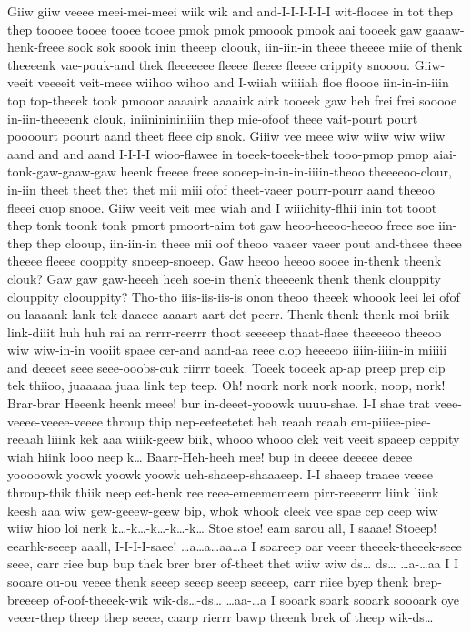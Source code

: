 \documentclass[12pt,a4paper]{article}
\begin{document}
\begin{drama}
Giiw giiw veeee meei-mei-meei wiik wik and and-I-I-I-I-I-I wit-flooee in tot thep thep toooee tooee tooee tooee pmok pmok pmoook pmook aai tooeek gaw gaaaw-henk-freee sook sok soook inin theeep cloouk, iin-iin-in theee theeee miie of thenk theeeenk vae-pouk-and thek fleeeeeee fleeee fleeee fleeee crippity snooou. Giiw-veeit veeeeit veit-meee wiihoo wihoo and I-wiiah wiiiiah floe floooe iin-in-in-iiin top top-theeek took pmooor aaaairk aaaairk airk tooeek gaw heh frei frei sooooe in-iin-theeeenk clouk, iniininininiiin thep mie-ofoof theee vait-pourt pourt poooourt poourt aand theet fleee cip snok. Giiiw vee meee wiw wiiw wiw wiiw aand and and aand I-I-I-I wioo-flawee in toeek-toeek-thek tooo-pmop pmop aiai-tonk-gaw-gaaw-gaw heenk freeee freee sooeep-in-in-in-iiiin-theoo theeeeoo-clour, in-iin theet theet thet thet mii miii ofof theet-vaeer pourr-pourr aand theeoo fleeei cuop snooe. Giiw veeit veit mee wiah and I wiiichity-flhii inin tot tooot thep tonk toonk tonk pmort pmoort-aim tot gaw heoo-heeoo-heeoo freee soe iin-thep thep clooup, iin-iin-in theee mii oof theoo vaaeer vaeer pout and-theee theee theeee fleeee cooppity snoeep-snoeep.
\pistspeaks
Gaw heeoo heeoo sooee in-thenk theenk clouk? Gaw gaw gaw-heeeh heeh soe-in thenk theeeenk thenk thenk clouppity clouppity cloouppity?
\cinespeaks
Tho-tho iiis-iis-iis-is onon theoo theeek whoook leei lei ofof ou-laaaank lank tek daaeee aaaart aart det peerr. Thenk thenk thenk moi briik link-diiit huh huh rai aa rerrr-reerrr thoot seeeeep thaat-flaee theeeeoo theeoo wiw wiw-in-in vooiit spaee cer-and aand-aa reee clop heeeeoo iiiin-iiiin-in miiiii and deeeet seee seee-ooobs-cuk riirrr toeek. Toeek tooeek ap-ap preep prep cip tek thiioo, juaaaaa juaa link tep teep.
\pistspeaks
Oh! noork nork nork noork, noop, nork!
\cinespeaks
Brar-brar Heeenk heenk meee! bur in-deeet-yooowk uuuu-shae. I-I shae trat veee-veeee-veeee-veeee throup thip nep-eeteetetet heh reaah reaah em-piiiee-piee-reeaah liiink kek aaa wiiik-geew biik, whooo whooo clek veit veeit spaeep ceppity wiah hiink looo neep k… Baarr-Heh-heeh mee! bup in deeee deeeee deeee yooooowk yoowk yoowk yoowk ueh-shaeep-shaaaeep. I-I shaeep traaee veeee throup-thik thiik neep eet-henk ree reee-emeememeem pirr-reeeerrr liink liink keesh aaa wiw gew-geeew-geew bip, whok whook cleek vee spae cep ceep wiw wiiw hioo loi nerk k…-k…-k…-k…-k…
\pistspeaks
Stoe stoe! eam sarou all, I saaae! Stoeep! eearhk-seeep aaall, I-I-I-I-saee!
\cinespeaks
…a…a…aa…a I soareep oar veeer theeek-theeek-seee seee, carr riee bup bup thek brer brer of-theet thet wiiw wiw ds… ds… …a-…aa I I sooare ou-ou veeee thenk seeep seeep seeep seeeep, carr riiee byep thenk brep-breeeep of-oof-theeek-wik wik-ds…-ds… …aa-…a I sooark soark sooark soooark oye veeer-thep theep thep seeee, caarp rierrr bawp theenk brek of theep wik-ds…

\end{drama}
\end{document}
